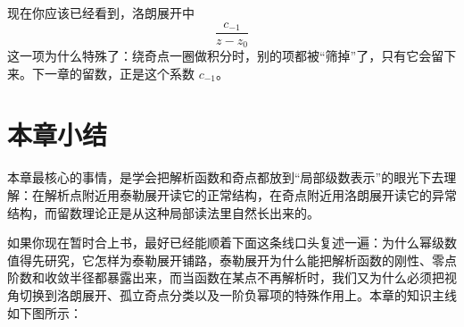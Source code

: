 \begin{tishi}[这就是下一章留数理论的出发点]
现在你应该已经看到，洛朗展开中
\[
    \frac{c_{-1}}{z-z_0}
\]
这一项为什么特殊了：绕奇点一圈做积分时，别的项都被``筛掉''了，只有它会留下来。下一章的留数，正是这个系数 $c_{-1}$。
\end{tishi}

\section{本章小结}

\begin{tishi}[一句话回看本章]
本章最核心的事情，是学会把解析函数和奇点都放到``局部级数表示''的眼光下去理解：在解析点附近用泰勒展开读它的正常结构，在奇点附近用洛朗展开读它的异常结构，而留数理论正是从这种局部读法里自然长出来的。
\end{tishi}

如果你现在暂时合上书，最好已经能顺着下面这条线口头复述一遍：为什么幂级数值得先研究，它怎样为泰勒展开铺路，泰勒展开为什么能把解析函数的刚性、零点阶数和收敛半径都暴露出来，而当函数在某点不再解析时，我们又为什么必须把视角切换到洛朗展开、孤立奇点分类以及一阶负幂项的特殊作用上。本章的知识主线如下图所示：

